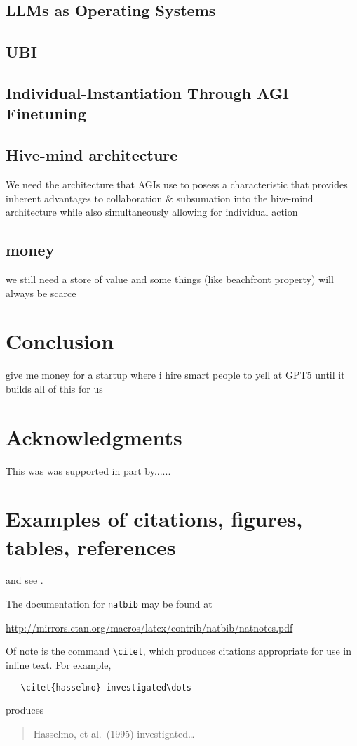 \documentclass{article}
\begin{document}
\subsection{LLMs as Operating Systems}

\subsection{UBI}

\subsection{Individual-Instantiation Through AGI Finetuning}

\subsection{Hive-mind architecture}
We need the architecture that AGIs use to posess a characteristic that provides inherent advantages to collaboration \& subsumation into the hive-mind architecture while also simultaneously allowing for individual action

\subsection{money}
we still need a store of value and some things (like beachfront property) will always be scarce



\section{Conclusion}
give me money for a startup where i hire smart people to yell at GPT5 until it builds all of this for us

\section*{Acknowledgments}
This was was supported in part by......


\section{Examples of citations, figures, tables, references}
\label{sec:others}
\lipsum[8] \cite{kour2014real,kour2014fast} and see \cite{hadash2018estimate}.

The documentation for \verb+natbib+ may be found at
\begin{center}
  \url{http://mirrors.ctan.org/macros/latex/contrib/natbib/natnotes.pdf}
\end{center}
Of note is the command \verb+\citet+, which produces citations
appropriate for use in inline text.  For example,
\begin{verbatim}
   \citet{hasselmo} investigated\dots
\end{verbatim}
produces
\begin{quote}
  Hasselmo, et al.\ (1995) investigated\dots
\end{quote}
\end{document}
